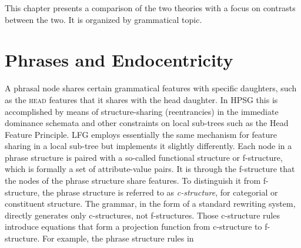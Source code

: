 \documentclass[output=paper]{langsci/langscibook}
\begin{document}
This chapter presents a comparison of the two theories with a focus on contrasts between the two.  It is organized by grammatical topic.  


\section{Phrases and Endocentricity} 
A phrasal node shares certain grammatical features with specific daughters, such as the \textsc{head} features that it shares with the head daughter.  In HPSG this is accomplished
by means of structure-sharing (reentrancies) in the immediate dominance schemata and other 
constraints on local sub-trees such as the Head Feature Principle.  LFG employs essentially the same mechanism for feature sharing in a local sub-tree but implements it slightly differently.  Each node in a phrase structure is paired with a so-called functional structure or f-structure, which is formally a set of attribute-value pairs.  It is through the f-structure that the nodes of the phrase structure share features.   To distinguish it from f-structure, the phrase structure is referred to as \textit{c-structure}, for categorial or constituent structure.  The grammar, in the form of a standard rewriting system, directly generates only c-structures, not f-structures.   Those c-structure rules introduce equations that form a projection function from c-structure to f-structure.  For example,
the phrase structure rules in 

\eal
\ex \label{ex:sample_eng_gram_lex1} %
{
}

\ex %

{
}

\ex %

{
}

\ex %

{
\qquad{}

\qquad\feqs{(\up \num) = \pl}
 }
\end{document}
